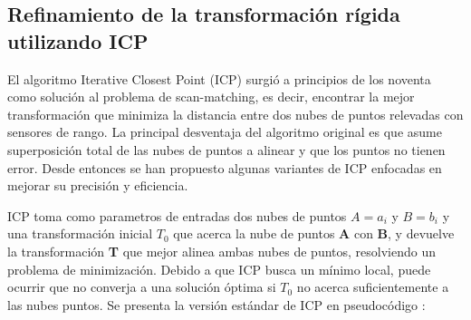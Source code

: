 \subsection{Refinamiento de la transformación rígida utilizando ICP}

El algoritmo Iterative Closest Point (ICP) \cite{Besl92} surgió a principios de los noventa como solución al problema de scan-matching, es decir, encontrar la mejor transformación que minimiza la distancia entre dos nubes de puntos relevadas con sensores de rango. La principal desventaja del algoritmo original es que asume superposición total de las nubes de puntos a alinear y que los puntos no tienen error. Desde entonces se han propuesto algunas variantes de ICP enfocadas en mejorar su precisión y eficiencia.

ICP toma como parametros de entradas dos nubes de puntos $A = {a_{i}}$ y $B = {b_{i}}$ y una transformación inicial $T_{0}$ que acerca la nube de puntos \textbf{A} con \textbf{B}, y devuelve la transformación \textbf{T} que mejor alinea ambas nubes de puntos, resolviendo un problema de minimización. Debido a que ICP busca un mínimo local, puede ocurrir que no converja a una solución óptima si $T_{0}$ no acerca suficientemente a las nubes puntos. Se presenta la versión estándar de ICP en pseudocódigo :





